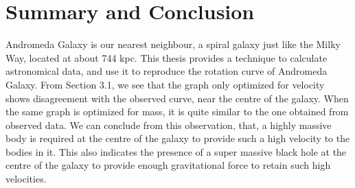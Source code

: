 \chapter{Summary and Conclusion}

Andromeda Galaxy is our nearest neighbour, a spiral galaxy just like the Milky Way, located at about 744 kpc. This thesis provides a technique to calculate astronomical data, and use it to reproduce the rotation curve of Andromeda Galaxy. From Section 3.1, we see that the graph only optimized for velocity shows disagreement with the observed curve, near the centre of the galaxy. When the same graph is optimized for mass, it is quite similar to the one obtained from observed data. We can conclude from this observation, that, a highly massive body is required at the centre of the galaxy to provide such a high velocity to the bodies in it. This also indicates the presence of a super massive black hole at the centre of the galaxy to provide enough gravitational force to retain such high velocities.
